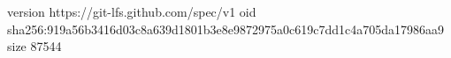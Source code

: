 version https://git-lfs.github.com/spec/v1
oid sha256:919a56b3416d03c8a639d1801b3e8e9872975a0c619c7dd1c4a705da17986aa9
size 87544
